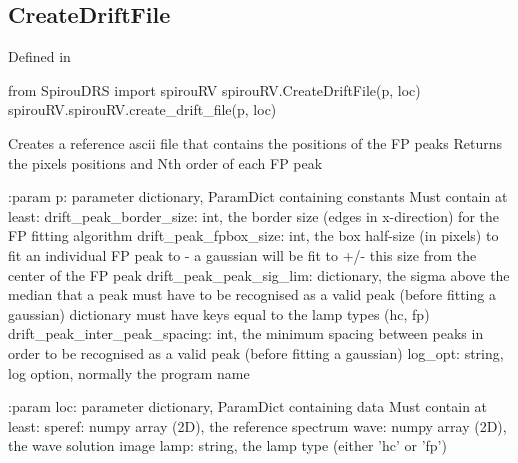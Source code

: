 \begin{minipage}{\textwidth}
\subsection{CreateDriftFile}

Defined in \spirouRV{}

\begin{pythonbox}
from SpirouDRS import spirouRV
spirouRV.CreateDriftFile(p, loc)
spirouRV.spirouRV.create_drift_file(p, loc)
\end{pythonbox}

\begin{pythondocstring}
Creates a reference ascii file that contains the positions of the FP peaks
Returns the pixels positions and Nth order of each FP peak

:param p: parameter dictionary, ParamDict containing constants
    Must contain at least:
            drift_peak_border_size: int, the border size (edges in
                                    x-direction) for the FP fitting
                                    algorithm
            drift_peak_fpbox_size: int, the box half-size (in pixels) to
                                   fit an individual FP peak to - a
                                   gaussian will be fit to +/- this size
                                   from the center of the FP peak
            drift_peak_peak_sig_lim: dictionary, the sigma above the median
                                     that a peak must have to be recognised
                                     as a valid peak (before fitting a
                                     gaussian) dictionary must have keys
                                     equal to the lamp types (hc, fp)
            drift_peak_inter_peak_spacing: int, the minimum spacing between
                                           peaks in order to be recognised
                                           as a valid peak (before fitting
                                           a gaussian)
            log_opt: string, log option, normally the program name

:param loc: parameter dictionary, ParamDict containing data
        Must contain at least:
            speref: numpy array (2D), the reference spectrum
            wave: numpy array (2D), the wave solution image
            lamp: string, the lamp type (either 'hc' or 'fp')


\end{pythondocstring}
\end{minipage}
